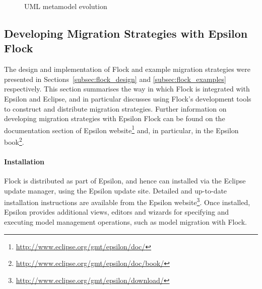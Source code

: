 \begin{landscape}	
\begin{figure}[ht]
	\centering
	\caption{UML metamodel evolution}
\label{fig:uml_mms}
\end{figure}
\end{landscape}	


\subsection{Developing Migration Strategies with Epsilon Flock}
\label{subsec:flock_guide}
The design and implementation of Flock and example migration strategies were presented in Sections~\ref{subsec:flock_design} and \ref{subsec:flock_examples} respectively. This section summarises the way in which Flock is integrated with Epsilon and Eclipse, and in particular discusses using Flock's development tools to construct and distribute migration strategies. Further information on developing migration strategies with Epsilon Flock can be found on the documentation section of Epsilon website\footnote{\url{http://www.eclipse.org/gmt/epsilon/doc/}} and, in particular, in the Epsilon book\footnote{\url{http://www.eclipse.org/gmt/epsilon/doc/book/}}.

\paragraph{Installation} Flock is distributed as part of Epsilon, and hence can installed via the Eclipse update manager, using the Epsilon update site. Detailed and up-to-date installation instructions are available from the Epsilon website\footnote{\url{http://www.eclipse.org/gmt/epsilon/download/}}. Once installed, Epsilon provides additional views, editors and wizards for specifying and executing model management operations, such as model migration with Flock.

